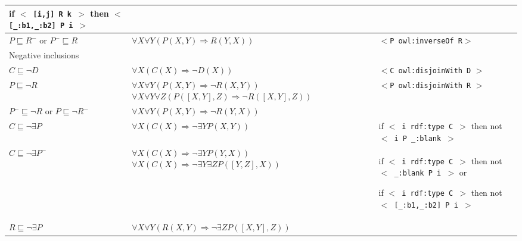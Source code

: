 \documentclass[]{article}
\begin{document}
\begin{longtable}{| p{3.7cm} | p{7cm} | p{5.2cm} |}
		\cellcolor[gray]{0.9} if $<$\texttt{ [i,j] R k }$>$ \newline
		then $<$\texttt{ [\_:b1,\_:b2] P i }$>$
	\\
	
	\hline
		$P \sqsubseteq R^{-}$ or $P^{-} \sqsubseteq R$		
		&
		$\forall X \forall Y (P(X,Y) \Rightarrow R(Y,X)) $
		&
		$<$\texttt{P owl:inverseOf R}$>$
	\\
	
	\hline	
		Negative inclusions & &
	\\
	
	\hline
		$C \sqsubseteq \neg D$	
		&
		$\forall X (C(X) \Rightarrow \neg D(X)) $
		&
		$<$\texttt{C owl:disjoinWith D} $>$
	\\
	
	\hline
		\cellcolor[gray]{0.9} $P \sqsubseteq \neg R$	
		&
		\cellcolor[gray]{0.9} $\forall X \forall Y (P(X,Y) \Rightarrow \neg R(X,Y)) $ \newline
		\cellcolor[gray]{0.9} $\forall X \forall Y \forall Z(P([X,Y],Z) \Rightarrow \neg R([X,Y],Z)) $
		&
		\cellcolor[gray]{0.9} $<$\texttt{P owl:disjoinWith R} $>$
	\\
	
	\hline
		$P^{-} \sqsubseteq \neg R$	or $P \sqsubseteq \neg R^{-}$
		&
		$\forall X \forall Y (P(X,Y) \Rightarrow \neg R(Y,X)) $
		&
	\\
	
	\hline
		$C \sqsubseteq \neg \exists P$
		&
		$\forall X (C(X) \Rightarrow \neg \exists Y P(X,Y)) $
		&
		if $<$\texttt{ i rdf:type C }$>$ \newline
		then not $<$\texttt{ i P \_:blank }$>$
	\\
	
	\hline
		\cellcolor[gray]{0.9} $C \sqsubseteq \neg \exists P^{-}$	
		&
		\cellcolor[gray]{0.9} $\forall X (C(X) \Rightarrow \neg \exists Y P(Y,X)) $ \newline
		\cellcolor[gray]{0.9} $\forall X (C(X) \Rightarrow \neg \exists Y \exists Z P([Y,Z],X)) $
		&
		if $<$\texttt{ i rdf:type C }$>$ \newline
		then not $<$\texttt{ \_:blank P i }$>$ or \newline
		
		if $<$\texttt{ i rdf:type C }$>$ \newline
		then not $<$\texttt{ [\_:b1,\_:b2] P i }$>$
	\\
	
	\hline
		\cellcolor[gray]{0.7} $R \sqsubseteq \neg \exists P$	
		&
		\cellcolor[gray]{0.7} $\forall X \forall Y (R(X,Y) \Rightarrow \neg \exists Z P([X,Y],Z))$
		&
	\\
	

\end{longtable}
\end{document}
